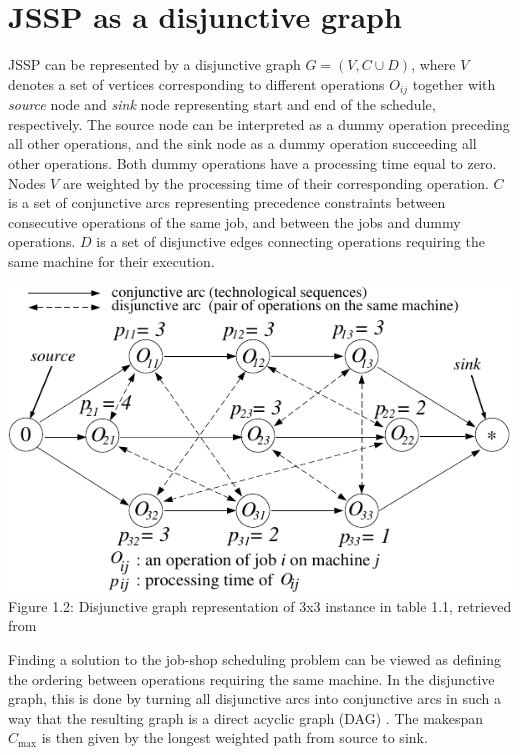 \section{JSSP as a disjunctive graph}

JSSP can be represented by a disjunctive graph \cite{YamadaNakanoJSSP, BLAZEWICZ2000317} $G = ( V, C \cup D )$, where $V$ denotes a set of vertices corresponding to different operations $O_{ij}$ together with \textit{source} node and \textit{sink} node representing start and end of the schedule, respectively. The source node can be interpreted as a dummy operation preceding all other operations, and the sink node as a dummy operation succeeding all other operations. Both dummy operations have a processing time equal to zero. Nodes $V$ are weighted by the processing time of their corresponding operation. $C$ is a set of conjunctive arcs representing precedence constraints between consecutive operations of the same job, and between the jobs and dummy operations. $D$ is a set of disjunctive edges connecting operations requiring the same machine for their execution.
\begin{center}
    \includegraphics[width=0.7\linewidth]{images/jssp_disjunctive_graph.pdf}\\
    Figure 1.2: Disjunctive graph representation of 3x3 instance in table 1.1, retrieved from \cite{YamadaNakanoJSSP}
\end{center}

Finding a solution to the job-shop scheduling problem can be viewed as defining the ordering between operations requiring the same machine. In the disjunctive graph, this is done by turning all disjunctive arcs into conjunctive arcs \cite{YamadaNakanoJSSP, BLAZEWICZ2000317} in such a way that the resulting graph is a direct acyclic graph (DAG) \cite{doi:10.1287/opre.17.6.941}. The makespan $C_\text{max}$ is then given by the longest weighted path from source to sink.